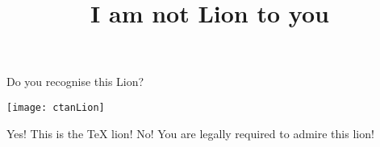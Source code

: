 \documentclass{webquiz}
\title{I am not Lion to you}
\begin{document}
  \begin{question}
    Do you recognise this Lion?
    \begin{center}
        \texttt{[image: ctanLion]}
    \end{center}
    \begin{choice}
      \correct Yes!  \response This is the \TeX{} lion!
      \incorrect No! \response You are legally required to admire this lion!
    \end{choice}
  \end{question}
\end{document}

